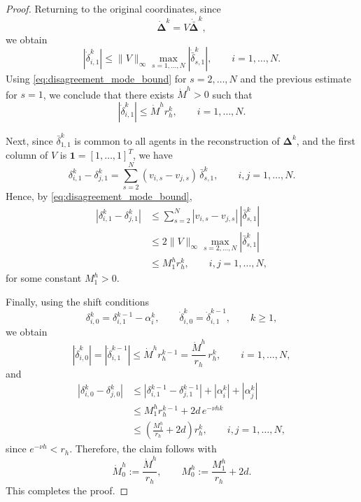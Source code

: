 \documentclass[10pt,a4paper]{amsart}
\begin{document}
\begin{proof}
Returning to the original coordinates, since
\[
\dot{\bm{\Delta}}^k = V\dot{\bar{\bm{\Delta}}}^k,
\]
we obtain
\[
|\dot{\delta}_{i,1}^{k}|
\le
\|V\|_\infty \max_{s=1,\dots,N}|\dot{\bar{\delta}}_{s,1}^{k}|,
\qquad i=1,\dots,N.
\]
Using \eqref{eq:disagreement_mode_bound} for \(s=2,\dots,N\) and the previous estimate for \(s=1\), we conclude that there exists \(\dot M^h>0\) such that
\begin{equation}\label{eq:rate_bound_index1}
|\dot{\delta}_{i,1}^{k}|
\le
\dot M^h r_h^k,
\qquad i=1,\dots,N.
\end{equation}

Next, since \(\bar{\delta}_{1,1}^k\) is common to all agents in the reconstruction of \(\bm{\Delta}^k\), and the first column of \(V\) is \(\mathbf 1=[1,\dots,1]^T\), we have
\[
\delta_{i,1}^k-\delta_{j,1}^k
=
\sum_{s=2}^{N}(v_{i,s}-v_{j,s})\,\bar{\delta}_{s,1}^{k},
\qquad i,j=1,\dots,N.
\]
Hence, by \eqref{eq:disagreement_mode_bound},
\[
\begin{split}
|\delta_{i,1}^k-\delta_{j,1}^k|
&\le
\sum_{s=2}^{N}|v_{i,s}-v_{j,s}|\,|\bar{\delta}_{s,1}^{k}|
\\
&\le
2\|V\|_\infty \max_{s=2,\dots,N} |\bar{\delta}_{s,1}^{k}|
\\
&\le
M_1^h r_h^k,
\qquad i,j=1,\dots,N,
\end{split}
\]
for some constant \(M_1^h>0\).

Finally, using the shift conditions
\[
\delta_{i,0}^k=\delta_{i,1}^{k-1}-\alpha_i^{k},
\qquad
\dot\delta_{i,0}^k=\dot\delta_{i,1}^{k-1},
\qquad k\ge 1,
\]
we obtain
\[
|\dot\delta_{i,0}^k|
=
|\dot\delta_{i,1}^{k-1}|
\le
\dot M^h r_h^{k-1}
=
\frac{\dot M^h}{r_h}\,r_h^k,
\qquad i=1,\dots,N,
\]
and
\[
\begin{split}
|\delta_{i,0}^k-\delta_{j,0}^k|
&\le
|\delta_{i,1}^{k-1}-\delta_{j,1}^{k-1}|+|\alpha_i^k|+|\alpha_j^k|
\\
&\le
M_1^h r_h^{k-1}+2d\,e^{-\nu hk}
\\
&\le
\left(\frac{M_1^h}{r_h}+2d\right) r_h^k,
\qquad i,j=1,\dots,N,
\end{split}
\]
since \(e^{-\nu h}<r_h\). Therefore, the claim follows with
\[
\dot M_0^h:=\frac{\dot M^h}{r_h},
\qquad
M_0^h:=\frac{M_1^h}{r_h}+2d.
\]
This completes the proof.
\end{proof}
\end{document}
